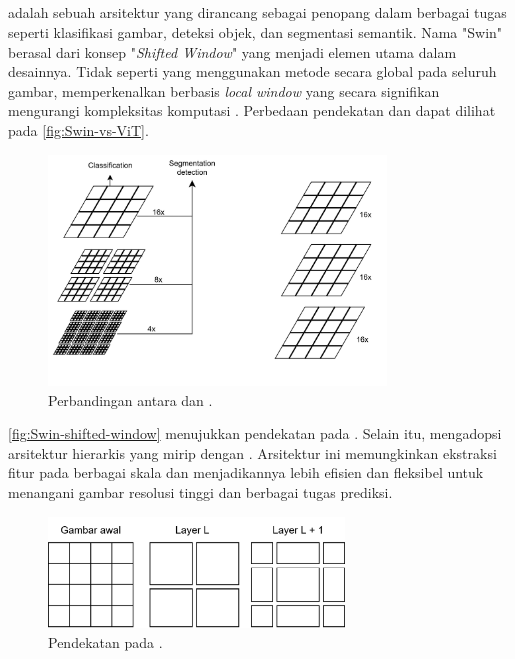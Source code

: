 \subsection{\swin}
\label{subsec:swin}

\swin{} adalah sebuah arsitektur \vitfull{} yang dirancang sebagai penopang dalam berbagai tugas \cv{} seperti klasifikasi gambar, deteksi objek, dan segmentasi semantik. Nama "Swin" berasal dari konsep
"\emph{Shifted Window}" yang menjadi elemen utama dalam desainnya. Tidak seperti \vit{} yang menggunakan metode \selfattention{} secara global
pada seluruh gambar, \swin{} memperkenalkan \selfattention{} berbasis \emph{local window} yang secara signifikan mengurangi kompleksitas komputasi \parencite{liu2021swin}. Perbedaan pendekatan \swin{} dan \vit{} dapat dilihat pada \autoref{fig:Swin-vs-ViT}. 

\begin{figure}[htbp]
    \centering
    \includegraphics[width=0.8\textwidth]{images/swin-vit.png}
    \caption{Perbandingan antara \swin{} dan \vitfull{} \parencite{liu2021swin}.}
    \label{fig:Swin-vs-ViT}
\end{figure}


\autoref{fig:Swin-shifted-window} menujukkan pendekatan \shiftedwindow{} pada \swin. Selain itu, \swin{} mengadopsi arsitektur hierarkis yang mirip dengan \cnn. Arsitektur ini memungkinkan ekstraksi fitur pada berbagai skala dan menjadikannya lebih efisien dan fleksibel untuk menangani gambar resolusi tinggi dan berbagai tugas prediksi.

\begin{figure}[htbp]
    \centering
    \includegraphics[width=0.7\textwidth]{images/swin-shifted-window.png}
    \caption{Pendekatan \shiftedwindow{} pada \swin{} \parencite{liu2021swin}.}
    \label{fig:Swin-shifted-window}
\end{figure}

